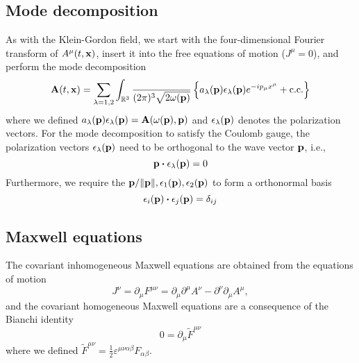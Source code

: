 \subsection{Mode decomposition}

As with the Klein-Gordon field, we start with the four-dimensional Fourier transform of $A^\mu(t,\vb{x})$, insert it into the free equations of motion ($J^\mu=0$), and perform the mode decomposition
\begin{equation}
	\vb{A}(t,\vb{x})
	=
	\sum_{\lambda=1,2}
	\int_{\mathbb{R}^3}\frac{}{(2\pi)^3\sqrt{2\omega(\vb{p})}}
	\left\{
		a_\lambda(\vb{p})
		\vb{\epsilon}_\lambda(\vb{p})
		e^{-ip_\mu x^\mu}
		+
		\text{c.c.}
	\right\}
	\label{eq:mw_ft}
\end{equation}
where we defined $a_\lambda(\vb{p})\vb{\epsilon}_\lambda(\vb{p})=\vb{A}(\omega(\vb{p}),\vb{p})$ and $\vb{\epsilon}_\lambda(\vb{p})$ denotes the polarization vectors.
For the mode decomposition to satisfy the Coulomb gauge, the polarization vectors $\vb{\epsilon}_\lambda(\vb{p})$ need to be orthogonal to the wave vector $\vb{p}$, i.e.,
\begin{equation}
	\vb{p}\vdot\vb{\epsilon}_\lambda(\vb{p})
	=
	0	
\end{equation}
Furthermore, we require the $\vb{p}/\norm{\vb{p}},\vb{\epsilon}_1(\vb{p}),\vb{\epsilon}_2(\vb{p})$ to form a orthonormal basis
\begin{equation}
	\vb{\epsilon}_i(\vb{p})
	\vdot
	\vb{\epsilon}_j(\vb{p})
	=
	\delta_{ij}
\end{equation}

\subsection{Maxwell equations}

The covariant inhomogeneous Maxwell equations are obtained from the equations of motion
\begin{equation}
	J^\nu
	=
	\partial_\mu F^{\mu\nu}
	=
	\partial_\mu\partial^\mu A^\nu
	-
	\partial^\nu\partial_\mu A^\mu
	\label{eq:mw_inhomo},
\end{equation}
and the covariant homogeneous Maxwell equations are a consequence of the Bianchi identity
\begin{equation}
	0
	=
	\partial_\mu\tilde{F}^{\mu\nu}
	\label{eq:mw_homo}
\end{equation}
where we defined $\tilde{F}^{\mu\nu}=\frac{1}{2}\varepsilon^{\mu\nu\alpha\beta}F_{\alpha\beta}$.

